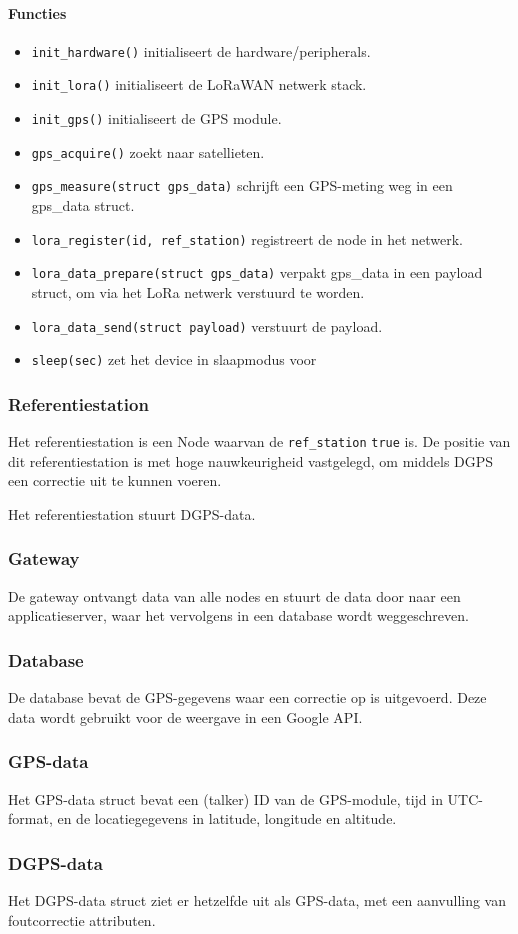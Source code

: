 \paragraph{Functies}
\begin{itemize}
    \item \texttt{init\_hardware()} initialiseert de hardware/peripherals.
    \item \texttt{init\_lora()} initialiseert de LoRaWAN netwerk stack.
    \item \texttt{init\_gps()} initialiseert de GPS module.
    \item \texttt{gps\_acquire()} zoekt naar satellieten.
    \item \texttt{gps\_measure(struct gps\_data)} schrijft een GPS-meting weg in een gps\_data struct.
    \item \texttt{lora\_register(id, ref\_station)} registreert de node in het netwerk.
    \item \texttt{lora\_data\_prepare(struct gps\_data)} verpakt gps\_data in een payload struct, om via het LoRa netwerk verstuurd te worden.
    \item \texttt{lora\_data\_send(struct payload)} verstuurt de payload.
    \item \texttt{sleep(sec)} zet het device in slaapmodus voor
\end{itemize}

\subsubsection{Referentiestation}
Het referentiestation is een Node waarvan de \texttt{ref\_station} \texttt{true} is. De positie van dit referentiestation is met hoge nauwkeurigheid vastgelegd, om middels DGPS een correctie uit te kunnen voeren.

Het referentiestation stuurt DGPS-data.

\subsubsection{Gateway}
De gateway ontvangt data van alle nodes en stuurt de data door naar een applicatieserver, waar het vervolgens in een database wordt weggeschreven.

\subsubsection{Database}
De database bevat de GPS-gegevens waar een correctie op is uitgevoerd. Deze data wordt gebruikt voor de weergave in een Google API.

\subsubsection{GPS-data}
Het GPS-data struct bevat een (talker) ID van de GPS-module, tijd in UTC-format, en de locatiegegevens in latitude, longitude en altitude.

\subsubsection{DGPS-data}
Het DGPS-data struct ziet er hetzelfde uit als GPS-data, met een aanvulling van foutcorrectie attributen.